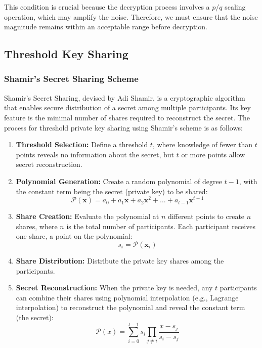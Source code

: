 \documentclass[11pt]{article}
\begin{document}
This condition is crucial because the decryption process involves a $p/q$ scaling operation, which may amplify the noise. Therefore, we must ensure that the noise magnitude remains within an acceptable range before decryption.


\subsection{Threshold Key Sharing}
\label{sec:key_sharing}

\subsubsection{Shamir's Secret Sharing Scheme}
\label{sec:shamir}

Shamir's Secret Sharing\cite{pang2005new}, devised by Adi Shamir, is a cryptographic algorithm that enables secure distribution of a secret among multiple participants. Its key feature is the minimal number of shares required to reconstruct the secret. The process for threshold private key sharing using Shamir's scheme is as follows:

\begin{enumerate}
    \item \textbf{Threshold Selection:} Define a threshold $t$, where knowledge of fewer than $t$ points reveals no information about the secret, but $t$ or more points allow secret reconstruction.
    
    \item \textbf{Polynomial Generation:} Create a random polynomial of degree $t-1$, with the constant term being the secret (private key) to be shared:
    \begin{equation}
        \mathcal{P}(\mathbf{x})=a_0+a_1\mathbf{x}+a_2\mathbf{x}^2+\ldots+a_{t-1}\mathbf{x}^{t-1}
    \end{equation}
    
    \item \textbf{Share Creation:} Evaluate the polynomial at $n$ different points to create $n$ shares, where $n$ is the total number of participants. Each participant receives one share, a point on the polynomial:
    \begin{equation}
        s_i=\mathcal{P}(\mathbf{x}_i)
    \end{equation}
    
    \item \textbf{Share Distribution:} Distribute the private key shares among the participants.
    
    \item \textbf{Secret Reconstruction:} When the private key is needed, any $t$ participants can combine their shares using polynomial interpolation (e.g., Lagrange interpolation) to reconstruct the polynomial and reveal the constant term (the secret):
    \begin{equation}
        \mathcal{P}(x)=\sum^{t-1}_{i=0}s_i\prod_{j\neq i}\frac{x-s_j}{s_i-s_j}
    \end{equation}
\end{enumerate}
\end{document}
